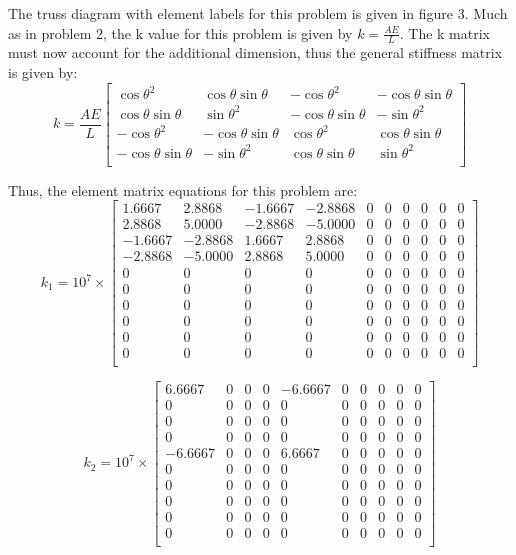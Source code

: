 \documentclass[8pt]{article}
\begin{document}
The truss diagram with element labels for this problem is given in figure 3. Much as in problem 2, the k value for this problem is given by \(k=\frac{AE}{L}\). The k matrix must now account for the additional dimension, thus the general stiffness matrix is given by:
\[
k=\frac{AE}{L}
\begin{bmatrix}
    \cos\theta^2 & \cos\theta\sin\theta & -\cos\theta^2 & -\cos\theta\sin\theta \\
    \cos\theta\sin\theta & \sin\theta^2 & -\cos\theta\sin\theta & -\sin\theta^2 \\
    -\cos\theta^2 & -\cos\theta\sin\theta & \cos\theta^2 & \cos\theta\sin\theta \\
    -\cos\theta\sin\theta & -\sin\theta^2 & \cos\theta\sin\theta & \sin\theta^2 \\
\end{bmatrix}
\]

Thus, the element matrix equations for this problem are:
\[
k_1 = 10^7 \times
\begin{bmatrix}
1.6667 & 2.8868 & -1.6667 & -2.8868 & 0 & 0 & 0 & 0 & 0 & 0 \\
2.8868 & 5.0000 & -2.8868 & -5.0000 & 0 & 0 & 0 & 0 & 0 & 0 \\
-1.6667 & -2.8868 & 1.6667 & 2.8868 & 0 & 0 & 0 & 0 & 0 & 0 \\
-2.8868 & -5.0000 & 2.8868 & 5.0000 & 0 & 0 & 0 & 0 & 0 & 0 \\
0 & 0 & 0 & 0 & 0 & 0 & 0 & 0 & 0 & 0 \\
0 & 0 & 0 & 0 & 0 & 0 & 0 & 0 & 0 & 0 \\
0 & 0 & 0 & 0 & 0 & 0 & 0 & 0 & 0 & 0 \\
0 & 0 & 0 & 0 & 0 & 0 & 0 & 0 & 0 & 0 \\
0 & 0 & 0 & 0 & 0 & 0 & 0 & 0 & 0 & 0 \\
0 & 0 & 0 & 0 & 0 & 0 & 0 & 0 & 0 & 0 \\
\end{bmatrix}
\]

\[
k_2 = 10^7 \times
\begin{bmatrix}
6.6667 & 0 & 0 & 0 & -6.6667 & 0 & 0 & 0 & 0 & 0 \\
0 & 0 & 0 & 0 & 0 & 0 & 0 & 0 & 0 & 0 \\
0 & 0 & 0 & 0 & 0 & 0 & 0 & 0 & 0 & 0 \\
0 & 0 & 0 & 0 & 0 & 0 & 0 & 0 & 0 & 0 \\
-6.6667 & 0 & 0 & 0 & 6.6667 & 0 & 0 & 0 & 0 & 0 \\
0 & 0 & 0 & 0 & 0 & 0 & 0 & 0 & 0 & 0 \\
0 & 0 & 0 & 0 & 0 & 0 & 0 & 0 & 0 & 0 \\
0 & 0 & 0 & 0 & 0 & 0 & 0 & 0 & 0 & 0 \\
0 & 0 & 0 & 0 & 0 & 0 & 0 & 0 & 0 & 0 \\
0 & 0 & 0 & 0 & 0 & 0 & 0 & 0 & 0 & 0 \\
\end{bmatrix}
\]
\end{document}
